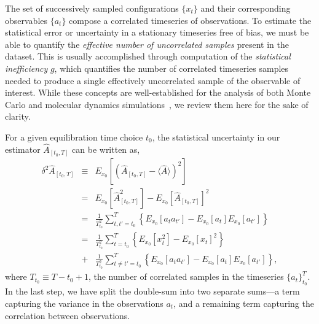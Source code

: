 \documentclass[aps,pre,twocolumn,nofootinbib,superscriptaddress,linenumbers,11point]{revtex4-1}
\newcommand{\expect}[1]{\langle #1 \rangle}                %
\newcommand{\estimator}[1]{\hat{#1}}                       %
\begin{document}
The set of successively sampled configurations $\{x_t\}$ and their corresponding observables $\{a_t\}$ compose a correlated timeseries of observations.
To estimate the statistical error or uncertainty in a stationary timeseries free of bias, we must be able to quantify the \emph{effective number of uncorrelated samples} present in the dataset.
This is usually accomplished through computation of the \emph{statistical inefficiency} $g$, which quantifies the number of correlated timeseries samples needed to produce a single effectively uncorrelated sample of the observable of interest.
While these concepts are well-established for the analysis of both Monte Carlo and molecular dynamics simulations~\cite{mueller-krumbhaar:j-stat-phys:1973:monte-carlo-analysis,swope:jcp:1982:autocorrelation-analysis,janke:2002:error-analysis,chodera:jctc:2007:wham}, we review them here for the sake of clarity.

For a given equilibration time choice $t_0$, the statistical uncertainty in our estimator $\hat{A}_{[t_0,T]}$ can be written as,
\begin{eqnarray}
\delta^2 \estimator{A}_{[t_0,T]} &\equiv& E_{x_0}\left[\left(\hat{A}_{[t_0,T]} - \expect{\estimator{A}}\right)^2\right] \nonumber \\
&=& E_{x_0}\left[ \hat{A}_{[t_0,T]} ^2 \right] - E_{x_0}\left[ \hat{A}_{[t_0,T]}  \right]^2 \nonumber \\
&=& \frac{1}{T_{t_0}^2} \sum_{t,t'=t_0}^T \left\{ E_{x_0}\left[a_t a_{t'}\right] - E_{x_0}\left[a_t\right] E_{x_0}\left[a_{t'}\right] \right\} \nonumber \\
&=& \frac{1}{T_{t_0}^2} \sum_{t=t_0}^T \left\{ E_{x_0}\left[x_t^2\right] - E_{x_0}\left[x_t\right]^2 \right\} \\
\mbox{} &+& \frac{1}{T_{t_0}^2} \sum_{t\ne t' = t_0}^T \left\{ E_{x_0}\left[a_t a_{t'}\right] - E_{x_0}\left[a_t\right] E_{x_0}\left[a_{t'}\right] \right\} \nonumber ,
\end{eqnarray}
where $T_{t_0} \equiv T - t_0 + 1$, the number of correlated samples in the timeseries $\{a_t\}_{t_0}^T$.
In the last step, we have split the double-sum into two separate sums---a term capturing the variance in the observations $a_t$, and a remaining term capturing the correlation between observations. 
\end{document}
